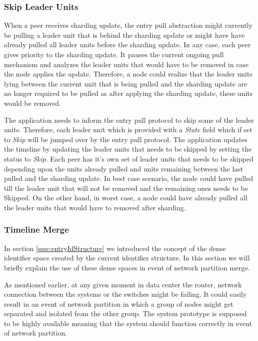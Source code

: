\documentclass[a4paper,11pt]{kth-mag}
\begin{document}
\subsubsection{Skip Leader Units}

When a peer receives sharding update, the entry pull abstraction might currently be pulling a leader unit that is behind the sharding update or might have have already pulled all leader units before the sharding update. In any case, each peer gives priority to the sharding update. It pauses the current ongoing pull mechanism and analyzes the leader units that would have to be removed in case the node applies the update. Therefore, a node could realize that the leader units lying between the current unit that is being pulled and the sharding update are no longer required to be pulled as after applying the sharding update, these units would be removed.
\par The application needs to inform the entry pull protocol to skip some of the leader units. Therefore, each leader unit which is provided with a \textit{State} field which if set to \textit{Skip} will be jumped over by the entry pull protocol. The application updates the timeline by updating the leader units that needs to be skipped by setting the status to \textit{Skip}. Each peer has it's own set of leader units that needs to be skipped depending upon the units already pulled and units remaining between the last pulled and the sharding update. In best case scenario, the node could have pulled till the leader unit that will not be removed and the remaining ones needs to be Skipped. On the other hand, in worst case, a node could have already pulled all the leader units that would have to removed after sharding.

\subsubsection{Timeline Merge}
In section \ref{ssec:entryIdStructure} we introduced the concept of the dense identifier space created by the current identifier structure. In this section we will briefly explain the use of these dense spaces in event of network partition merge.


\par As mentioned earlier, at any given moment in data center the router, network connection between the systems or the switches might be failing. It could easily result in an event of network partition in which a group of nodes might get separated and isolated from the other group. The system prototype is supposed to be highly available meaning that the system should function correctly in event of network partition.
\end{document}
